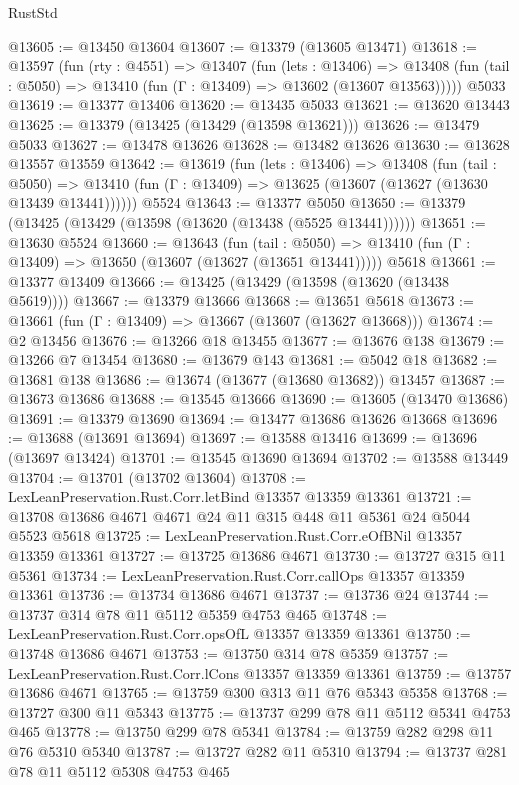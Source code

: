 \begin{lexlean}{RustStd}
\begin{coremodule}
@13605 := @13450 @13604
@13607 := @13379 (@13605 @13471)
@13618 := @13597
    (fun (rty : @4551) =>
    @13407
      (fun (lets : @13406) =>
      @13408 (fun (tail : @5050) => @13410 (fun (Γ : @13409) => @13602 (@13607 @13563)))))
    @5033
@13619 := @13377 @13406
@13620 := @13435 @5033
@13621 := @13620 @13443
@13625 := @13379 (@13425 (@13429 (@13598 @13621)))
@13626 := @13479 @5033
@13627 := @13478 @13626
@13628 := @13482 @13626
@13630 := @13628 @13557 @13559
@13642 := @13619
    (fun (lets : @13406) =>
    @13408
      (fun (tail : @5050) =>
      @13410 (fun (Γ : @13409) => @13625 (@13607 (@13627 (@13630 @13439 @13441))))))
    @5524
@13643 := @13377 @5050
@13650 := @13379 (@13425 (@13429 (@13598 (@13620 (@13438 (@5525 @13441))))))
@13651 := @13630 @5524
@13660 := @13643
    (fun (tail : @5050) => @13410 (fun (Γ : @13409) => @13650 (@13607 (@13627 (@13651 @13441)))))
    @5618
@13661 := @13377 @13409
@13666 := @13425 (@13429 (@13598 (@13620 (@13438 @5619))))
@13667 := @13379 @13666
@13668 := @13651 @5618
@13673 := @13661 (fun (Γ : @13409) => @13667 (@13607 (@13627 @13668)))
@13674 := @2 @13456
@13676 := @13266 @18 @13455
@13677 := @13676 @138
@13679 := @13266 @7 @13454
@13680 := @13679 @143
@13681 := @5042 @18
@13682 := @13681 @138
@13686 := @13674 (@13677 (@13680 @13682)) @13457
@13687 := @13673 @13686
@13688 := @13545 @13666
@13690 := @13605 (@13470 @13686)
@13691 := @13379 @13690
@13694 := @13477 @13686 @13626 @13668
@13696 := @13688 (@13691 @13694)
@13697 := @13588 @13416
@13699 := @13696 (@13697 @13424)
@13701 := @13545 @13690 @13694
@13702 := @13588 @13449
@13704 := @13701 (@13702 @13604)
@13708 := LexLeanPreservation.Rust.Corr.letBind @13357 @13359 @13361
@13721 := @13708 @13686 @4671 @4671 @24 @11 @315 @448 @11 @5361 @24 @5044 @5523 @5618
@13725 := LexLeanPreservation.Rust.Corr.eOfBNil @13357 @13359 @13361
@13727 := @13725 @13686 @4671
@13730 := @13727 @315 @11 @5361
@13734 := LexLeanPreservation.Rust.Corr.callOps @13357 @13359 @13361
@13736 := @13734 @13686 @4671
@13737 := @13736 @24
@13744 := @13737 @314 @78 @11 @5112 @5359 @4753 @465
@13748 := LexLeanPreservation.Rust.Corr.opsOfL @13357 @13359 @13361
@13750 := @13748 @13686 @4671
@13753 := @13750 @314 @78 @5359
@13757 := LexLeanPreservation.Rust.Corr.lCons @13357 @13359 @13361
@13759 := @13757 @13686 @4671
@13765 := @13759 @300 @313 @11 @76 @5343 @5358
@13768 := @13727 @300 @11 @5343
@13775 := @13737 @299 @78 @11 @5112 @5341 @4753 @465
@13778 := @13750 @299 @78 @5341
@13784 := @13759 @282 @298 @11 @76 @5310 @5340
@13787 := @13727 @282 @11 @5310
@13794 := @13737 @281 @78 @11 @5112 @5308 @4753 @465

\end{coremodule}
\end{lexlean}
